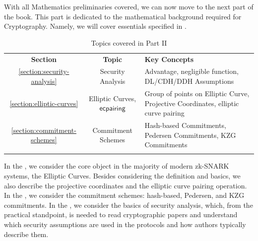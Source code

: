 \documentclass[../../../book]{subfiles}
\begin{document}
With all Mathematics preliminaries covered, we can now move to the next part of
the book. This part is dedicated to the mathematical background required for
Cryptography. Namely, we will cover essentials specified in .

\begin{table}[H]
    \centering
    \begin{tabularx}{\textwidth}{ccX}
        \Xhline{3\arrayrulewidth}
        \rowcolor{green!30}\textbf{Section} & \textbf{Topic} & \textbf{Key Concepts} \\
        \Xhline{3\arrayrulewidth}
        \rowcolor{green!10}\ref{section:security-analysis} & Security Analysis & Advantage, negligible function, DL/CDH/DDH Assumptions \\
        \hline
        \rowcolor{green!10}\ref{section:elliptic-curves} & Elliptic Curves, $\mathsf{ecpairing}$ & Group of points on Elliptic Curve, Projective Coordinates, elliptic curve pairing \\
        \hline
        \rowcolor{green!20}\ref{section:commitment-schemes} & Commitment Schemes &
        Hash-based Commitments, Pedersen Commitments, KZG Commitments \\
        \Xhline{3\arrayrulewidth}
    \end{tabularx}
    \caption{Topics covered in Part II}
    \label{tab:essentialls-2}
\end{table}

In the , we consider the core object in the
majority of modern zk-SNARK systems, the Elliptic Curves. Besides considering
the definition and basics, we also describe the projective coordinates and the
elliptic curve pairing operation. In the , we
consider the commitment schemes: hash-based, Pedersen, and KZG commitments. In
the , we consider the basics of security
analysis, which, from the practical standpoint, is needed to read 
cryptographic papers and understand which security assumptions are used in the
protocols and how authors typically describe them.
\end{document}
